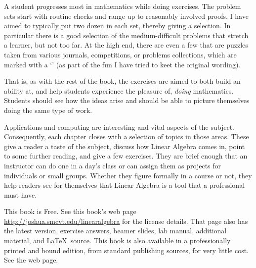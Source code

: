 {%

A student progresses most in mathematics while doing exercises. 
The problem sets start with 
routine checks and range up to reasonably involved proofs.
I have aimed to typically put two dozen in each set, 
thereby giving a selection.
In particular there is a good selection of the medium-difficult problems
that stretch a learner, but not too far.
At the high end, there are even a few that are puzzles
taken from various journals, competitions, or
problems collections, which  
are marked with a
`\puzzlemark'  
(as part of the fun I have tried to keet the original wording).

That is, as with the rest of the book, 
the exercises are aimed to both build an ability at,
and help students experience the pleasure of, 
\emph{doing} mathematics.
Students should see how the ideas arise and should be able to 
picture themselves doing the same type of work.


\medskip
{}
Applications and computing are interesting and vital aspects 
of the subject.
Consequently, each chapter closes with a selection of
topics in those areas.
These give a reader
a taste of the subject, discuss how Linear Algebra comes in,
point to some further reading, and give a few exercises. 
They are brief enough that an instructor can do one
in a day's class 
or can assign them as projects for individuals or small groups.
Whether they figure formally in a course or not, they help
readers see for themselves that Linear Algebra is a tool
that a professional must have. 




\medskip
{}
This book is Free.
See this book's web page 
\url{http://joshua.smcvt.edu/linearalgebra}
for the license details.
That page also has the latest version, 
exercise answers, beamer slides, lab manual, additional material,
and \LaTeX\ source.
This book is also available in a professionally printed and bound edition,
from standard publishing sources, for very little cost.
See the web page.



}
